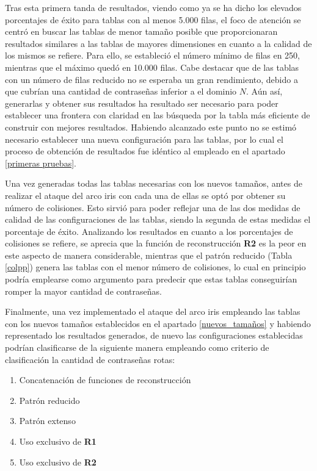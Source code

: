 \documentclass[12pt,spanish,listoffigures,listoftables,listofalgorithms]{tfgetsinf}
\begin{document}
Tras esta primera tanda de resultados, viendo como ya se ha dicho los elevados porcentajes de éxito para tablas con al menos 5.000 filas, el foco de atención se centró en buscar las tablas de menor tamaño posible que proporcionaran resultados similares a las tablas de mayores dimensiones en cuanto a la calidad de los mismos se refiere. Para ello, se estableció el número mínimo de filas en 250, mientras que el máximo quedó en 10.000 filas. Cabe destacar que de las tablas con un número de filas reducido no se esperaba un gran rendimiento, debido a que cubrían una cantidad de contraseñas inferior a el dominio $N$. Aún así, generarlas y obtener sus resultados ha resultado ser necesario para poder establecer una frontera con claridad en las búsqueda por la tabla más eficiente de construir con mejores resultados. Habiendo alcanzado este punto no se estimó necesario establecer una nueva configuración para las tablas, por lo cual el proceso de obtención de resultados fue idéntico al empleado en el apartado \ref{primeras pruebas}.

Una vez generadas todas las tablas necesarias con los nuevos tamaños, antes de realizar el ataque del arco iris con cada una de ellas se optó por obtener su número de colisiones. Esto sirvió para poder reflejar una de las dos medidas de calidad de las configuraciones de las tablas, siendo la segunda de estas medidas el porcentaje de éxito. Analizando los resultados en cuanto a los porcentajes de colisiones se refiere, se aprecia que la función de reconstrucción \textbf{R2} es la peor en este aspecto de manera considerable, mientras que el patrón reducido (Tabla \ref{colpp}) genera las tablas con el menor número de colisiones, lo cual en principio podría emplearse como argumento para predecir que estas tablas conseguirían romper la mayor cantidad de contraseñas.

Finalmente, una vez implementado el ataque del arco iris empleando las tablas con los nuevos tamaños establecidos en el apartado \ref{nuevos_tamaños} y habiendo representado los resultados generados, de nuevo las configuraciones establecidas podrían clasificarse de la siguiente manera empleando como criterio de clasificación la cantidad de contraseñas rotas:

\begin{enumerate}

    \item Concatenación de funciones de reconstrucción
    
    \item Patrón reducido
    
    \item Patrón extenso
    
    \item Uso exclusivo de \textbf{R1}
    
    \item Uso exclusivo de \textbf{R2}
    
\end{enumerate}
\end{document}
